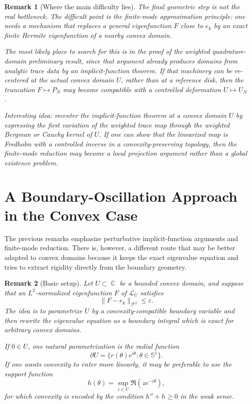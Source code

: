 \documentclass[a4paper,11pt,reqno]{amsart}
\newtheorem{remark}{Remark}[section]
\DeclareMathOperator{\C}{\mathbb{C}}
\begin{document}
\begin{remark}[Where the main difficulty lies]
The final geometric step is not the real bottleneck. The difficult point is the
finite-mode approximation principle: one needs a mechanism that replaces a
general eigenfunction \(F\) close to \(e_k\) by an exact finite Hermite
eigenfunction of a nearby convex domain.

The most likely place to search for this is in the proof of the weighted
quadrature-domain preliminary result, since that argument already produces
domains from analytic trace data by an implicit-function theorem. If that
machinery can be re-centered at the actual convex domain \(U\), rather than at a
reference disk, then the truncation \(F\mapsto P_N\) may become compatible with
a controlled deformation \(U\mapsto U_N\).

Interesting idea: recenter the implicit-function theorem at a convex domain
\(U\) by expressing the first variation of the weighted trace map through the
weighted Bergman or Cauchy kernel of \(U\). If one can show that the linearized
map is Fredholm with a controlled inverse in a convexity-preserving topology,
then the finite-mode reduction may become a local projection argument rather
than a global existence problem.
\end{remark}

\section{A Boundary-Oscillation Approach in the Convex Case}

The previous remarks emphasize perturbative implicit-function arguments and
finite-mode reduction. There is, however, a different route that may be better
adapted to convex domains because it keeps the exact eigenvalue equation and
tries to extract rigidity directly from the boundary geometry.

\begin{remark}[Basic setup]
Let \(U\subset\C\) be a bounded convex domain, and suppose that an
\(L^2\)-normalized eigenfunction \(F\) of \(\mathcal L_U\) satisfies
\[
\|F-e_k\|_{\mathcal F^2}\le \varepsilon.
\]
The idea is to parametrize \(U\) by a convexity-compatible boundary variable
and then rewrite the eigenvalue equation as a boundary integral which is exact
for arbitrary convex domains.

If \(0\in U\), one natural parametrization is the radial function
\[
\partial U=\{r(\theta)e^{i\theta}:\theta\in\mathbb S^1\}.
\]
If one wants convexity to enter more linearly, it may be preferable to use the
support function
\[
h(\theta)=\sup_{z\in U}\Re(ze^{-i\theta}),
\]
for which convexity is encoded by the condition \(h''+h\ge 0\) in the weak
sense.
\end{remark}
\end{document}
